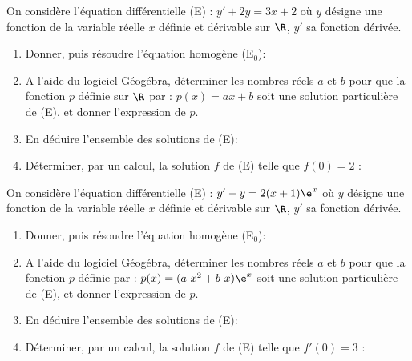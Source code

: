 \begin{exercice_cours}[\quad]{}

	On considère l’équation différentielle (E) : $y' + 2y = 3x+2$ où $y$ désigne une fonction de la variable réelle $x$ définie et dérivable sur $\R$, $y'$ sa fonction dérivée.

\begin{enumerate}
	\item Donner, puis résoudre l'équation homogène (E$_0$):\hfill\reponseLigne[7cm]{}  
	\item A l’aide du logiciel Géogébra, déterminer les nombres réels $a$ et $b$ pour que la fonction $p$ définie sur $\R$ par : $p(x) = ax+b$ soit une solution particulière de (E), et donner l’expression de $p$. \par\hfill\reponseLigne[7cm]{}
	\item En déduire l'ensemble des solutions de (E):   \hfill\reponseLigne[7cm]{}   
	\item Déterminer, par un calcul, la solution $f$ de (E) telle que $f(0)=2$ :   
\begin{blocvisiblex}[height=2]
{\quad}
\end{blocvisiblex}
\end{enumerate}
\end{exercice_cours}
\begin{exercice_cours}[\quad]{}

	On considère l’équation différentielle (E) : $y' - y = 2(x + 1)\e^x$ où $y$ désigne une fonction de la variable réelle $x$ définie et dérivable sur $\R$, $y'$ sa fonction dérivée.

\begin{enumerate}
	\item Donner, puis résoudre l'équation homogène (E$_0$):  \hfill\reponseLigne[7cm]{}
	\item A l’aide du logiciel Géogébra, déterminer les nombres réels $a$ et $b$ pour que la fonction $p$ définie par : $p(x) = (a~x^2+b~x)\e^x$ soit une solution particulière de (E), et donner l’expression de $p$. \par \hfill\reponseLigne[7cm]{}
	\item En déduire l'ensemble des solutions de (E): \hfill\reponseLigne[7cm]{}   	    
	\item Déterminer, par un calcul, la solution $f$ de (E) telle que $f'(0)=3$ : 	
\begin{blocvisiblex}[height=2]
{\quad}
\end{blocvisiblex}
\end{enumerate}
\end{exercice_cours}
